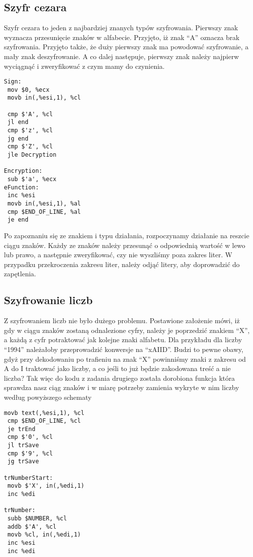 \subsection{Szyfr cezara}
Szyfr cezara to jeden z najbardziej znanych typów szyfrowania. Pierwszy znak wyznacza przesunięcie znaków w alfabecie. Przyjęto, iż znak "`A"' oznacza brak szyfrowania. Przyjęto także, że duży pierwszy znak ma powodować szyfrowanie, a mały znak deszyfrowanie. A co dalej następuje, pierwszy znak należy najpierw wyciągnąć i zweryfikować z czym mamy do czynienia.

\begin{lstlisting}[frame=single, basicstyle=\small, caption=Rozpoznanie znaku]
Sign:
 mov $0, %ecx
 movb in(,%esi,1), %cl

 cmp $'A', %cl
 jl end
 cmp $'z', %cl
 jg end
 cmp $'Z', %cl
 jle Decryption

Encryption:
 sub $'a', %ecx
eFunction:
 inc %esi
 movb in(,%esi,1), %al
 cmp $END_OF_LINE, %al
 je end
\end{lstlisting}

Po zapoznaniu się ze znakiem i typu działania, rozpoczynamy działanie na reszcie ciągu znaków. Każdy ze znaków należy przesunąć o odpowiednią wartość w lewo lub prawo, a następnie zweryfikować, czy nie wyszliśmy poza zakres liter. W przypadku przekroczenia zakresu liter, należy odjąć litery, aby doprowadzić do zapętlenia.

\subsection{Szyfrowanie liczb}
Z szyfrowaniem liczb nie było dużego problemu. Postawione założenie mówi, iż gdy w ciągu znaków zostaną odnalezione cyfry, należy je poprzedzić znakiem "`X"', a każdą z cyfr potraktować jak kolejne znaki alfabetu. Dla przykładu dla liczby "`1994"' należałoby przeprowadzić konwersje na "`xAIID"'. Budzi to pewne obawy, gdyż przy dekodowaniu po trafieniu na znak "`X"' powinniśmy znaki z zakresu od A do I traktować jako liczby, a co jeśli to już będzie zakodowana treść a nie liczba? Tak więc do kodu z zadania drugiego została dorobiona funkcja która sprawdza nasz ciąg znaków i w miarę potrzeby zamienia wykryte w nim liczby według powyższego schematy 

\begin{lstlisting}[frame=single, basicstyle=\small, caption=Szyfrowanie liczb całkowitych]
 movb text(,%esi,1), %cl
 cmp $END_OF_LINE, %cl
 je trEnd
 cmp $'0', %cl
 jl trSave
 cmp $'9', %cl
 jg trSave

trNumberStart:
 movb $'X', in(,%edi,1)
 inc %edi

trNumber:
 subb $NUMBER, %cl
 addb $'A', %cl
 movb %cl, in(,%edi,1)
 inc %esi
 inc %edi
\end{lstlisting}

